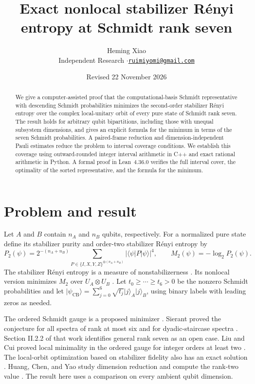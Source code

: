 \documentclass[11pt]{article}
\title{Exact nonlocal stabilizer R\'enyi entropy at Schmidt rank seven}
\author{Heming Xiao\\[0.25em]
  \normalsize Independent Research \enspace$\cdot$\enspace \href{mailto:ruimiyomi@gmail.com}{\nolinkurl{ruimiyomi@gmail.com}}}
\date{Revised 22 November 2026}
\newcommand{\CB}{\mathrm{CB}}
\begin{document}
\maketitle

\begin{abstract}
We give a computer-assisted proof that the computational-basis Schmidt
representative with descending Schmidt probabilities minimizes the
second-order stabilizer R\'enyi entropy over the complex local-unitary
orbit of every pure state of Schmidt rank seven. The result holds for
arbitrary qubit bipartitions, including those with unequal subsystem
dimensions, and gives an explicit formula for the minimum in terms of
the seven Schmidt probabilities. A paired-frame reduction and
dimension-independent Pauli estimates reduce the problem to interval
coverage conditions. We establish this coverage using outward-rounded
integer interval arithmetic in C++ and exact rational arithmetic in
Python. A formal proof in Lean~4.36.0 verifies the full interval
cover, the optimality of the sorted representative, and the formula
for the minimum.
\end{abstract}

\section{Problem and result}

Let \(A\) and \(B\) contain \(n_A\) and \(n_B\) qubits, respectively.
For a normalized pure state define its stabilizer purity and order-two
stabilizer R\'enyi entropy by
\[
 P_2(\psi)=2^{-(n_A+n_B)}
 \sum_{P\in\{I,X,Y,Z\}^{\otimes(n_A+n_B)}}
 |\langle\psi|P|\psi\rangle|^4,\qquad
 M_2(\psi)=-\log_2 P_2(\psi).
\]
The stabilizer R\'enyi entropy is a measure of nonstabilizerness
\cite{leone}. Its nonlocal version minimizes \(M_2\) over
\(U_A\otimes U_B\) \cite{cao,qw,torre,lcold}. Let
\(t_0\ge\cdots\ge t_6>0\) be the nonzero Schmidt probabilities and let
\(\lvert\psi_{\CB}\rangle=\sum_{j=0}^{6}\sqrt{t_j}\lvert j\rangle_A
\lvert j\rangle_B\), using binary labels with leading zeros as needed.

The ordered Schmidt gauge is a proposed minimizer
\cite{torre,lcold,fg,sierant}. Sierant proved the conjecture for all
spectra of rank at most six and for dyadic-staircase spectra
\cite[Theorems 1 and 2]{sierant}. Section II.2.2 of that work
identifies general rank seven as an open case. Liu and Cui proved local
minimality in the ordered gauge for integer orders at least two
\cite[Eq.~(5) and Appendix C]{lcnew}. The local-orbit optimization
based on stabilizer fidelity also has an exact solution
\cite{sfid,viscardi}. Huang, Chen,
and Yao study dimension reduction and compute the rank-two value
\cite{hcy}. The result here uses a comparison on every ambient qubit
dimension.
\end{document}
